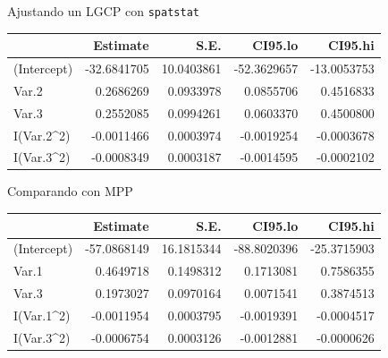 \documentclass[
  11pt,
  ignorenonframetext,
]{beamer}
\newenvironment{Shaded}{}{}
\newcommand{\DecValTok}[1]{\textcolor[rgb]{0.25,0.63,0.44}{#1}}
\newcommand{\FunctionTok}[1]{\textcolor[rgb]{0.02,0.16,0.49}{#1}}
\newcommand{\NormalTok}[1]{#1}
\newcommand{\OtherTok}[1]{\textcolor[rgb]{0.00,0.44,0.13}{#1}}
\newcommand{\SpecialCharTok}[1]{\textcolor[rgb]{0.25,0.44,0.63}{#1}}
\begin{document}
\begin{frame}[fragile]{Ajustando un LGCP con \texttt{spatstat}}
\protect\hypertarget{ajustando-un-lgcp-con-spatstat-1}{}
\begin{Shaded}
\end{Shaded}

\begin{longtable}[]{@{}lrrrr@{}}
\toprule()
& Estimate & S.E. & CI95.lo & CI95.hi \\
\midrule()
\endhead
(Intercept) & -32.6841705 & 10.0403861 & -52.3629657 & -13.0053753 \\
Var.2 & 0.2686269 & 0.0933978 & 0.0855706 & 0.4516833 \\
Var.3 & 0.2552085 & 0.0994261 & 0.0603370 & 0.4500800 \\
I(Var.2\^{}2) & -0.0011466 & 0.0003974 & -0.0019254 & -0.0003678 \\
I(Var.3\^{}2) & -0.0008349 & 0.0003187 & -0.0014595 & -0.0002102 \\
\bottomrule()
\end{longtable}
\end{frame}

\begin{frame}[fragile]{Comparando con MPP}
\protect\hypertarget{comparando-con-mpp}{}
\begin{Shaded}
\end{Shaded}

\begin{longtable}[]{@{}lrrrr@{}}
\toprule()
& Estimate & S.E. & CI95.lo & CI95.hi \\
\midrule()
\endhead
(Intercept) & -57.0868149 & 16.1815344 & -88.8020396 & -25.3715903 \\
Var.1 & 0.4649718 & 0.1498312 & 0.1713081 & 0.7586355 \\
Var.3 & 0.1973027 & 0.0970164 & 0.0071541 & 0.3874513 \\
I(Var.1\^{}2) & -0.0011954 & 0.0003795 & -0.0019391 & -0.0004517 \\
I(Var.3\^{}2) & -0.0006754 & 0.0003126 & -0.0012881 & -0.0000626 \\
\bottomrule()
\end{longtable}
\end{frame}
\end{document}
